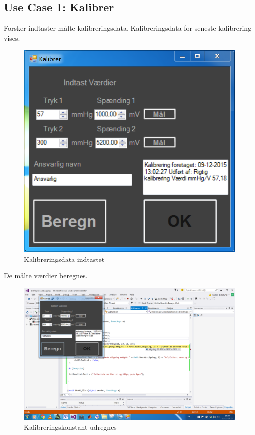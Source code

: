 \subsection{Use Case 1: Kalibrer}

Forsker indtaster målte kalibreringsdata. Kalibreringsdata for seneste kalibrering vises.

\begin{figure}[H]
	\centering
	\includegraphics[width=1\textwidth]{Figurer/Test_Kalibrer_1}
	\caption{Kalibreringsdata indtastet}
\end{figure}

De målte værdier beregnes.

\begin{figure}[H]
	\centering
	\includegraphics[width=1\textwidth]{Figurer/Test_Kalibrer_2}
	\caption{Kalibreringskonstant udregnes}
\end{figure}

